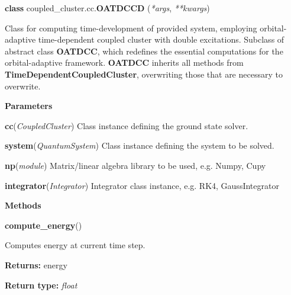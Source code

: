 \begin{tcolorbox}
    {\selectfont
    \textbf{class} coupled\_cluster.cc.\textbf{OATDCCD}
    (\emph{*args}, \emph{**kwargs})

    \vspace{1em}
    Class for computing time-development of provided system, employing orbital-adaptive 
    time-dependent coupled cluster with double excitations. Subclass of abstract 
    class \textbf{OATDCC}, which redefines the essential computations
    for the orbital-adaptive framework. \textbf{OATDCC} inherits all methods from 
    \textbf{TimeDependentCoupledCluster}, overwriting those that are necessary to
    overwrite.

    \vspace{1em}
    \textbf{Parameters}

    \hspace{2em}\textbf{cc}(\emph{CoupledCluster})
        Class instance defining the ground state solver.

    \hspace{2em}\textbf{system}(\emph{QuantumSystem}) 
        Class instance defining the system to be solved.

    \hspace{2em}\textbf{np}(\emph{module})
        Matrix/linear algebra library to be used, e.g. Numpy, Cupy
    
    \hspace{2em}\textbf{integrator}(\emph{Integrator})
        Integrator class instance, e.g. RK4, GaussIntegrator

    \vspace{1em}
    \textbf{Methods}

    \hspace{2em} \textbf{compute\_energy}()
        \begin{adjustwidth}{4em}{}
        Computes energy at current time step.

        \textbf{Returns:} energy
        
        \textbf{Return type:} \emph{float}
        \end{adjustwidth}

    }
\end{tcolorbox}